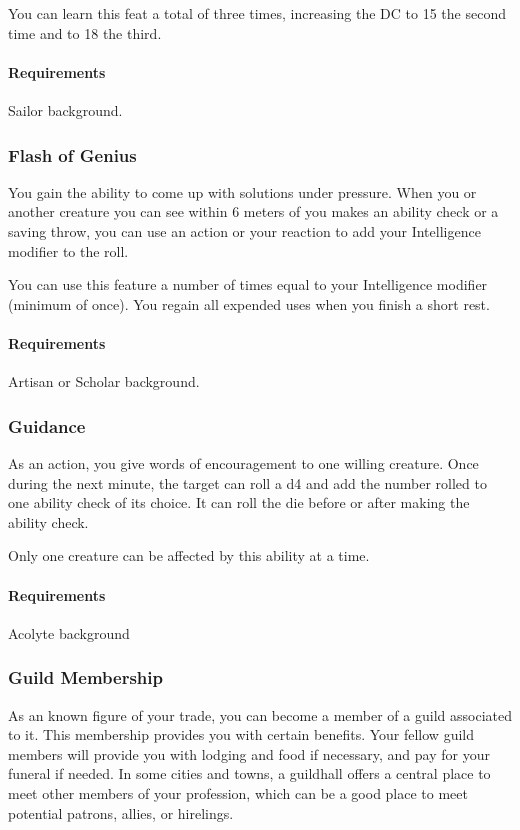     You can learn this feat a total of three times, increasing the DC to 15 the second time and to 18 the third.
    \paragraph{Requirements} Sailor background.
\subsubsection{Flash of Genius} \label{feat::flashofgenius}
    You gain the ability to come up with solutions under pressure.
    When you or another creature you can see within 6 meters of you makes an ability check or a saving throw, you can use an action or your reaction to add your Intelligence modifier to the roll.

    You can use this feature a number of times equal to your Intelligence modifier (minimum of once).
    You regain all expended uses when you finish a short rest.
    \paragraph{Requirements} Artisan or Scholar background.
\subsubsection{Guidance} \label{feat::guidance}
    As an action, you give words of encouragement to one willing creature.
    Once during the next minute, the target can roll a d4 and add the number rolled to one ability check of its choice.
    It can roll the die before or after making the ability check.

    Only one creature can be affected by this ability at a time.
    \paragraph{Requirements} Acolyte background
\subsubsection{Guild Membership} \label{feat::guildmembership}
    As an known figure of your trade, you can become a member of a guild associated to it.
    This membership provides you with certain benefits.
    Your fellow guild members will provide you with lodging and food if necessary, and pay for your funeral if needed.
    In some cities and towns, a guildhall offers a central place to meet other members of your profession, which can be a good place to meet potential patrons, allies, or hirelings.

